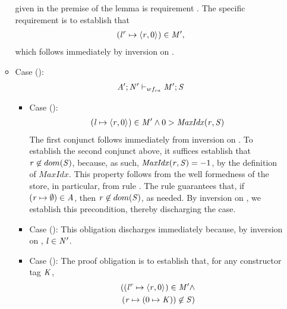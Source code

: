 \begin{nproof}
\begin{bcase}
\begin{itemize}
\begin{itemize}
      given in the premise of the lemma is requirement
      .
      The specific requirement is to establish that
      \begin{align*}
      ({\mathit{l}}^{\mathit{r}} \mapsto \langle \mathit{r}, 0 \rangle ^{}) \in \mathit{M}',
      \end{align*}
      which follows immediately by inversion on \dletlocstart{}.
      \item Case ():
      \begin{align*}
      \mathit{A}';\mathit{N}' \vdash_{wf_{ca}} \mathit{M}';\mathit{S}
      \end{align*}
        \begin{itemize}
        \item Case ():
        \begin{align*}
                  (\mathit{l} \mapsto \langle \mathit{r}, 0 \rangle ^{}) \in \mathit{M}' \wedge
          0 > \mathit{MaxIdx}(\mathit{r},\mathit{S})
        \end{align*}
        The first conjunct follows immediately from inversion on \dletlocstart{}.
        To establish the second conjunct above, it suffices establish
        that $\mathit{r} \not \in dom(\mathit{S})$,
        because, as such, $\mathit{MaxIdx}(\mathit{r},\mathit{S}) = -1$, by the definition of $MaxIdx$.
        This property follows from the well formedness of the
        store, in particular, from rule
        .
        The rule guarantees that, if $(\mathit{r} \mapsto \emptyset) \in \mathit{A}$, then
        $\mathit{r} \not \in dom(\mathit{S})$, as needed.
        By inversion on \tllstart{}, we establish this precondition, thereby
        discharging the case.
        \item Case ():
        This obligation discharges immediately because, by inversion on \tllstart{}, $\mathit{l} \in \mathit{N}'$.
        \item Case ():
        The proof obligation is to establish that, for any constructor tag $\mathit{K}$,
        \begin{align*}
         (({\mathit{l}}^{\mathit{r}} \mapsto \langle \mathit{r}, 0 \rangle ^{}) \in \mathit{M}' \wedge \\
          (\mathit{r} \mapsto (0 \mapsto \mathit{K})) \not \in \mathit{S})
        \end{align*}

\end{itemize}
\end{itemize}
\end{itemize}
\end{bcase}
\end{nproof}
